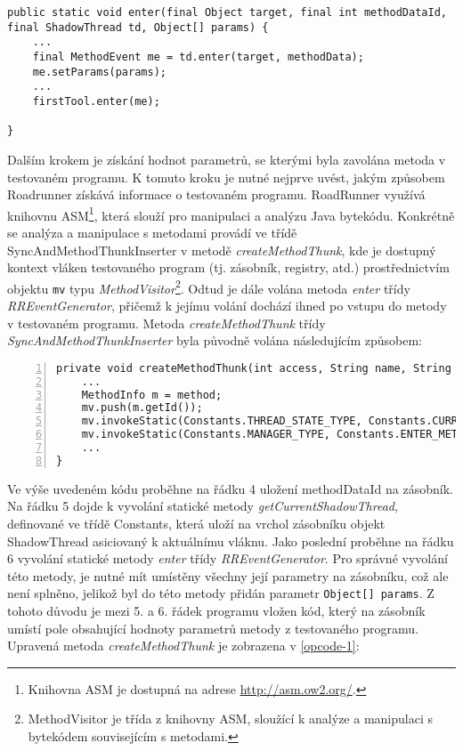 \begin{lstlisting}
public static void enter(final Object target, final int methodDataId, final ShadowThread td, Object[] params) {
	...
	final MethodEvent me = td.enter(target, methodData);
	me.setParams(params);
	...
	firstTool.enter(me);

}
\end{lstlisting}

Dalším krokem je získání hodnot parametrů, se kterými byla zavolána metoda v testovaném programu. K tomuto kroku je nutné nejprve uvést, jakým způsobem Roadrunner získává informace o testovaném programu. RoadRunner využívá knihovnu ASM\footnote{Knihovna ASM je dostupná na adrese \url{http://asm.ow2.org/}.}, která slouží pro manipulaci a analýzu Java bytekódu. Konkrétně se analýza a manipulace s metodami provádí ve třídě SyncAndMethodThunkInserter v metodě \textit{createMethodThunk}, kde je dostupný kontext vláken testovaného program (tj. zásobník, registry, atd.) prostřednictvím objektu \texttt{mv} typu \textit{MethodVisitor}\footnote{MethodVisitor je třída z knihovny ASM, sloužící k analýze a manipulaci s bytekódem souvisejícím s metodami.}. Odtud je dále volána metoda \textit{enter} třídy \textit{RREventGenerator}, přičemž k jejímu volání dochází ihned po vstupu do metody v testovaném programu. Metoda \textit{createMethodThunk} třídy \textit{SyncAndMethodThunkInserter} byla původně volána následujícím způsobem:

\begin{lstlisting}[frame=none, numbers=left, xleftmargin=1cm]
private void createMethodThunk(int access, String name, String desc, String signature, String[] exceptions, String wrappedMethodName, int maxLocals) {
	...
	MethodInfo m = method;
	mv.push(m.getId());
	mv.invokeStatic(Constants.THREAD_STATE_TYPE, Constants.CURRENT_THREAD_METHOD);
	mv.invokeStatic(Constants.MANAGER_TYPE, Constants.ENTER_METHOD);
	...
}
\end{lstlisting}

Ve výše uvedeném kódu proběhne na řádku 4 uložení methodDataId na zásobník. Na řádku 5 dojde k vyvolání statické metody \textit{getCurrentShadowThread}, definované ve třídě Constants, která uloží na vrchol zásobníku objekt ShadowThread asiciovaný k aktuálnímu vláknu. Jako poslední proběhne na řádku 6 vyvolání statické metody \textit{enter} třídy \textit{RREventGenerator}. Pro správné vyvolání této metody, je nutné mít umístěny všechny její parametry na zásobníku, což ale není splněno, jelikož byl do této metody přidán parametr \texttt{Object[] params}. Z tohoto důvodu je mezi 5. a 6. řádek programu vložen kód, který na zásobník umístí pole obsahující hodnoty parametrů metody z testovaného programu. Upravená metoda \textit{createMethodThunk} je zobrazena v \ref{opcode-1}:

